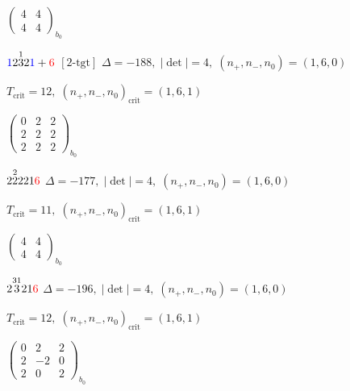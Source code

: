\documentclass[10pt]{article}
\begin{document}
\hspace{2em}$\left(\begin{smallmatrix}4 & 4 \\ 4 & 4\end{smallmatrix}\right)_{\!b_0}$

\smallskip

$\textcolor{blue}{1}2\overset{1}{3}2\textcolor{blue}{1}+\textcolor{red}{6}$ $\scriptstyle [2\text{-tgt}]$ \quad $\Delta=-188,\; |\det|=4,\; (n_+,n_-,n_0)=(1,6,0)$

\hspace{1em}$T_{\text{crit}}=12,\; (n_+,n_-,n_0)_{\text{crit}}=(1,6,1)$

\hspace{2em}$\left(\begin{smallmatrix}0 & 2 & 2 \\ 2 & 2 & 2 \\ 2 & 2 & 2\end{smallmatrix}\right)_{\!b_0}$

\smallskip

$2\overset{2}{2}221\textcolor{red}{6}$ \quad $\Delta=-177,\; |\det|=4,\; (n_+,n_-,n_0)=(1,6,0)$

\hspace{1em}$T_{\text{crit}}=11,\; (n_+,n_-,n_0)_{\text{crit}}=(1,6,1)$

\hspace{2em}$\left(\begin{smallmatrix}4 & 4 \\ 4 & 4\end{smallmatrix}\right)_{\!b_0}$

\smallskip

$2\overset{31}{3}21\textcolor{red}{6}$ \quad $\Delta=-196,\; |\det|=4,\; (n_+,n_-,n_0)=(1,6,0)$

\hspace{1em}$T_{\text{crit}}=12,\; (n_+,n_-,n_0)_{\text{crit}}=(1,6,1)$

\hspace{2em}$\left(\begin{smallmatrix}0 & 2 & 2 \\ 2 & -2 & 0 \\ 2 & 0 & 2\end{smallmatrix}\right)_{\!b_0}$

\smallskip
\end{document}
